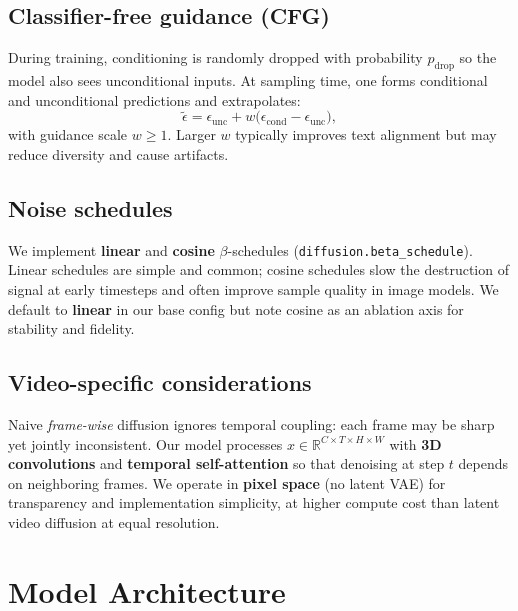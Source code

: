\documentclass[11pt,a4paper]{article}
\begin{document}
\subsection{Classifier-free guidance (CFG)}
During training, conditioning is randomly dropped with probability $p_{\text{drop}}$ so the model also sees unconditional inputs.
At sampling time, one forms conditional and unconditional predictions and extrapolates:
\begin{equation}
  \tilde{\epsilon} = \epsilon_{\text{unc}} + w\bigl(\epsilon_{\text{cond}} - \epsilon_{\text{unc}}\bigr),
  \label{eq:cfg}
\end{equation}
with guidance scale $w \ge 1$.
Larger $w$ typically improves text alignment but may reduce diversity and cause artifacts.

\subsection{Noise schedules}
We implement \textbf{linear} and \textbf{cosine} $\beta$-schedules (\texttt{diffusion.beta\_schedule}).
Linear schedules are simple and common; cosine schedules slow the destruction of signal at early timesteps and often improve sample quality in image models.
We default to \textbf{linear} in our base config but note cosine as an ablation axis for stability and fidelity.

\subsection{Video-specific considerations}
Naive \emph{frame-wise} diffusion ignores temporal coupling: each frame may be sharp yet jointly inconsistent.
Our model processes $x \in \mathbb{R}^{C\times T\times H\times W}$ with \textbf{3D convolutions} and \textbf{temporal self-attention} so that denoising at step $t$ depends on neighboring frames.
We operate in \textbf{pixel space} (no latent VAE) for transparency and implementation simplicity, at higher compute cost than latent video diffusion at equal resolution.

\section{Model Architecture}
\label{sec:arch}
\end{document}
